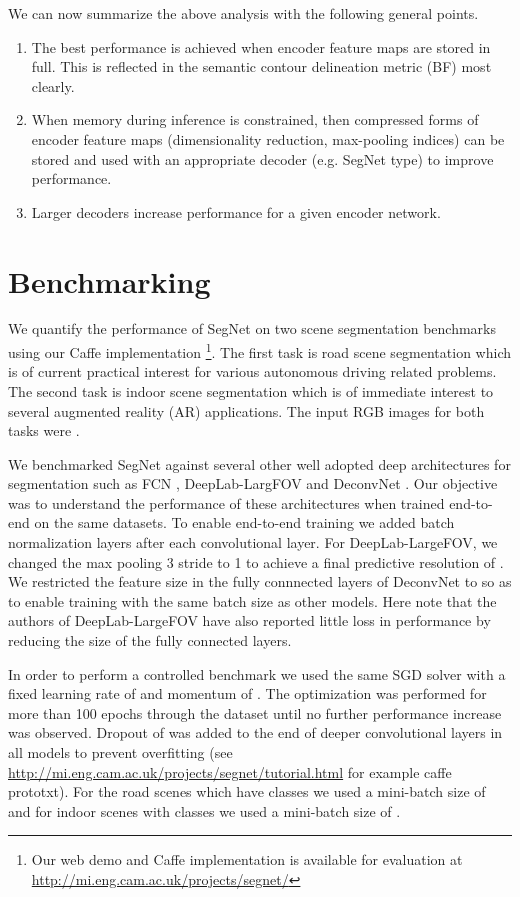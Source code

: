 \documentclass[10pt,journal,compsoc]{IEEEtran}
\begin{document}
We can now summarize the above analysis with the following general points.
\begin{enumerate}
\item The best performance is achieved when encoder feature maps are stored in full. This is reflected in the semantic contour delineation metric (BF) most clearly.
\item When memory during inference is constrained, then compressed forms of encoder feature maps (dimensionality reduction, max-pooling indices) can be stored and used with an appropriate decoder (e.g. SegNet type) to improve performance.
\item Larger decoders increase performance for a given encoder network.
\end{enumerate}




\section{Benchmarking}
\label{Benchmarking}
We quantify the performance of SegNet on two scene segmentation  benchmarks using our Caffe implementation \footnote{\label{webdemo} Our web demo and Caffe implementation is available for evaluation at \url{http://mi.eng.cam.ac.uk/projects/segnet/}}. The first task is road scene segmentation which is of current practical interest for various autonomous driving related problems. The second task is indoor scene segmentation which is of immediate interest to several augmented reality (AR) applications. The input RGB images for both tasks were . 

We benchmarked SegNet against several other well adopted deep architectures for segmentation such as FCN \cite{FCN}, DeepLab-LargFOV \cite{liang2015semantic} and DeconvNet \cite{noh2015learning}. Our objective was to understand the performance of these architectures when trained end-to-end on the same datasets. To enable end-to-end training we added batch normalization \cite{BN} layers after each convolutional layer. For DeepLab-LargeFOV, we changed the max pooling 3 stride to 1 to achieve a final predictive resolution of . We restricted the feature size in the fully connnected layers of DeconvNet to  so as to enable training with the same batch size as other models. Here note that the authors of DeepLab-LargeFOV \cite{liang2015semantic} have also reported little loss in performance by reducing the size of the fully connected layers.

 In order to perform a controlled benchmark we used the same SGD solver \cite{Bottou} with a fixed learning rate of  and momentum of . The optimization was performed for more than 100 epochs through the dataset until no further performance increase was observed. Dropout of  was added to the end of deeper convolutional layers in all models to prevent overfitting (see \url{http://mi.eng.cam.ac.uk/projects/segnet/tutorial.html} for example caffe prototxt). For the road scenes which have  classes we used a mini-batch size of  and for indoor scenes with  classes we used a mini-batch size of . 
\end{document}
